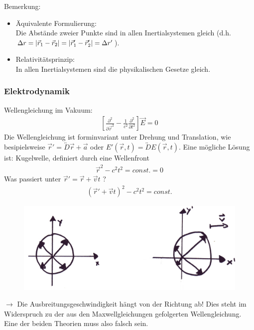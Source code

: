 Bemerkung:
\begin{itemize}
\item Äquivalente Formulierung:\\
Die Abstände zweier Punkte sind in allen Inertialsystemen gleich (d.h. $\Delta r = \left|\vec r_1 -\vec r_2\right|=\left|\vec r_1' -\vec r_2'\right|=\Delta r'$).
\item Relativitätsprinzip:\\
In allen Inertialsystemen sind die physikalischen Gesetze gleich.
\end{itemize}


\subsubsection{Elektrodynamik}
Wellengleichung im Vakuum:
\begin{eqnarray*}
\left[\frac{\partial^2}{\partial \vec r^2} - \frac 1 {c^2} \frac {\partial^2}{\partial t^2}\right] \vec E = 0
\end{eqnarray*}
Die Wellengleichung ist forminvariant unter Drehung und Translation, wie besipielsweise $\vec{r}'=\overleftrightarrow D\vec{r}+\vec{a}$ oder $E'(\vec{r},t)=\overleftrightarrow D E(\vec{r},t)$.
Eine mögliche Lösung ist: Kugelwelle, definiert durch eine Wellenfront
\begin{eqnarray*}
\vec r^2 - c^2t^2 = const.  = 0
\end{eqnarray*}
Was passiert unter $\vec r' = \vec r + \vec v t$ ?
\begin{eqnarray*}
(\vec r'+ \vec v t)^2 - c^2 t^2 = const.
\end{eqnarray*}

\begin{figure}
\begin{center}
	\includegraphics[scale=0.10]{Figs/Pim00013.png}
\end{center}
\end{figure}

$\longrightarrow$ Die Ausbreitungsgeschwindigkeit hängt von der Richtung ab! Dies steht im Widerspruch zu der aus den Maxwellgleichungen gefolgerten Wellengleichung. Eine der beiden Theorien muss also falsch sein. 

